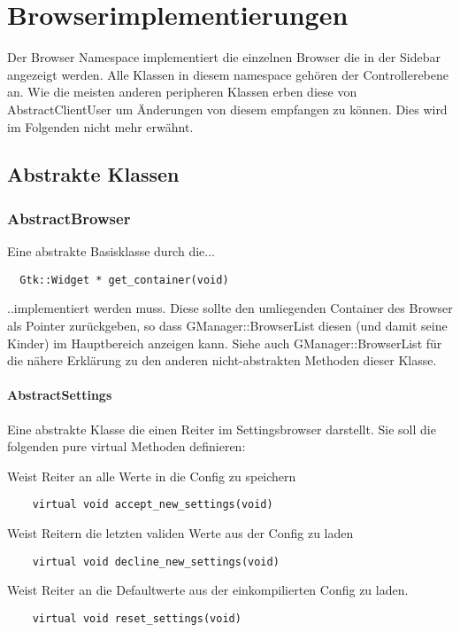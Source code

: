 \section{Browserimplementierungen}

Der Browser Namespace implementiert die einzelnen Browser die in der Sidebar angezeigt werden.
Alle Klassen in diesem namespace gehören der Controllerebene an.
Wie die meisten anderen peripheren Klassen erben diese von AbstractClientUser um Änderungen von diesem empfangen zu können. Dies wird im Folgenden nicht mehr erwähnt.

\subsection{Abstrakte Klassen}
\subsubsection{AbstractBrowser}
Eine abstrakte Basisklasse durch die...
\begin{verbatim}
  Gtk::Widget * get_container(void) 
\end{verbatim}
..implementiert werden muss. Diese sollte den umliegenden Container des Browser als Pointer zurückgeben,
so dass GManager::BrowserList diesen (und damit seine Kinder) im Hauptbereich anzeigen kann.
Siehe auch GManager::BrowserList für die nähere Erklärung zu den anderen nicht-abstrakten Methoden dieser Klasse.

\paragraph{AbstractSettings}
Eine abstrakte Klasse die einen Reiter im Settingsbrowser darstellt. 
Sie soll die folgenden pure virtual Methoden definieren:

Weist Reiter an alle Werte in die Config zu speichern
\begin{verbatim}
    virtual void accept_new_settings(void)
\end{verbatim}
     
Weist Reitern die letzten validen Werte aus der Config zu laden
\begin{verbatim}
    virtual void decline_new_settings(void)
\end{verbatim}     

Weist Reiter an die Defaultwerte aus der einkompilierten Config zu laden.
\begin{verbatim}
    virtual void reset_settings(void)
\end{verbatim}

